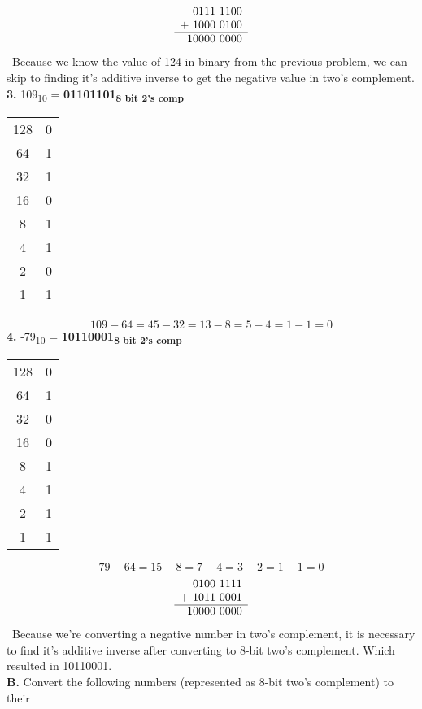 \documentclass[12pt, letterpaper, twoside]{article}
\begin{document}
$$\begin{array}[t]{r}
    0111\ 1100 \\
+ \ 1000\ 0100 \\ \hline
    10000\ 0000
\end{array}$$ \
Because we know the value of 124 in binary from the previous problem, we can skip to finding it's additive inverse to get the negative value in two's complement.\\
\newpage
\noindent\textbf{3.} 109\textsubscript{10} = \textbf{01101101\textsubscript{8 bit 2’s comp}}\\
\begin{center}
\begin{tabular}{c|c}
128 & 0\\
64 & 1\\
32 & 1\\
16 & 0\\ 
8 & 1\\
4 & 1\\
2 & 0\\
1 & 1\\
\end{tabular}
\end{center}
\[109 - 64 = 45 - 32 = 13 - 8 = 5 - 4 = 1 - 1 = 0\]
\noindent\textbf{4.} -79\textsubscript{10} = \textbf{10110001\textsubscript{8 bit 2’s comp}}
\begin{center}
\begin{tabular}{c|c}
128 & 0\\
64 & 1\\
32 & 0\\
16 & 0\\ 
8 & 1\\
4 & 1\\
2 & 1\\
1 & 1\\
\end{tabular}
\end{center}
\[79 - 64 = 15 - 8 = 7 - 4 = 3 - 2 = 1 - 1 = 0\]
$$\begin{array}[t]{r}
    0100\ 1111 \\
+ \ 1011\ 0001 \\ \hline
    10000\ 0000
\end{array}$$ \
Because we're converting a negative number in two's complement, it is necessary to find it's additive inverse after converting to  8-bit two's complement. Which resulted in 10110001.\\
\break
\noindent\textbf{B.} Convert the following numbers (represented as 8-bit two’s complement) to their
\end{document}
